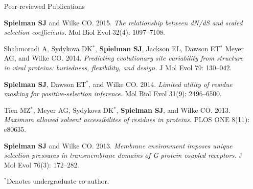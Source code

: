 \documentclass{resume} %
\begin{document}
\begin{rSection}{Peer-reviewed Publications}
\begin{etaremune}[leftmargin=1.5em]
\item \textbf{Spielman SJ} and Wilke CO. 2015. \emph{The relationship between dN/dS and scaled selection coefficients.} Mol Biol Evol 32(4): 1097--7108.\\


\item Shahmoradi A, Sydykova DK$^\ast$, \textbf{Spielman SJ}, Jackson EL, Dawson ET$^\ast$ Meyer AG, and Wilke CO. 2014. \emph{Predicting evolutionary site variability from structure in viral proteins: buriedness, flexibility, and design.} J Mol Evol 79: 130--042. \\


\item \textbf{Spielman SJ}, Dawson ET$^\ast$, and Wilke CO. 2014. \emph{Limited utility of residue masking for positive-selection inference.} Mol Biol Evol 31(9): 2496--6500. \\


\item Tien MZ$^\ast$, Meyer AG, Sydykova DK$^\ast$, \textbf{Spielman SJ}, and Wilke CO. 2013. \emph{Maximum allowed solvent accessibilites of residues in proteins.} PLOS ONE 8(11): e80635. \\


\item \textbf{Spielman SJ} and Wilke CO. 2013. \emph{Membrane environment imposes unique selection pressures in transmembrane domains of G-protein coupled receptors.} J Mol Evol 76(3): 172--282. \\

\end{etaremune}

$^\ast$Denotes undergraduate co-author.


\end{rSection}







\end{document}
